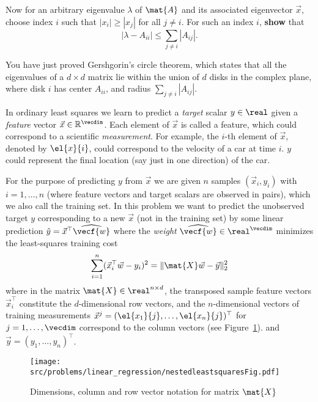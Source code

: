 \documentclass[preview]{standalone}
\begin{document}
\begin{Parts}
\Part Now for an arbitrary eigenvalue $\lambda$ of $\mat{A}$ and its
associated eigenvector $\vec{x}$, choose index $i$ such that $|x_i|
\geq |x_j|$ for all $j \neq i$. For such an index $i$, \textbf{show} that
$$|\lambda - A_{ii}| \leq \sum_{j \neq i} |A_{ij}|.$$

You have just proved Gershgorin's circle theorem, which states that
all the eigenvalues of a $d \times d$ matrix lie within the union of
$d$ disks in the complex plane, where disk $i$ has center $A_{ii}$,
and radius $\sum_{j \neq i} |A_{ij}|$.




\end{Parts}





In ordinary least squares we learn to predict a \emph{target} scalar
$y \in \real$ given a \emph{feature} vector
$\vec{x} \in \mathbb{R}^\vecdim$. Each element of $\vec{x}$ is called
a feature, which could correspond to a
scientific \emph{measurement}.
For example, the $i$-th element of
$\vec{x}$, denoted by $\el{x}{i}$, could correspond to the velocity of
a car at time $i$. $y$ could represent the final location (say just in
one direction) of the car.

For the purpose of predicting $y$ from $\vec{x}$ we are given $n$
samples $(\vec{x}_i, y_i)$ with $i = 1,\dots, n$ (where feature
vectors and target scalars are observed in pairs), which we also call
the training set. In this problem we want to predict the unobserved
target $y$ corresponding to a new $\vec{x}$ (not in the training set)
by some linear prediction $\hat{y} = \vec{x}^\top\widehat{\vecf{w}}$ where
the \emph{weight} $\widehat{\vecf{w}} \in \real^\vecdim$ minimizes the
least-squares training cost
\begin{equation*}
  \sum_{i=1}^n (\vec{x}_i^\top\vec{w} - y_i )^2 = \|\mat{X} \vec{w} - \vec{y} \|_2^2
\end{equation*}
where in the matrix $\mat{X} \in \real^{n\times d}$, the transposed
sample feature vectors $\vec{x}_i^\top$ constitute the $d$-dimensional row
vectors, and the $n$-dimensional vectors of training measurements
$\vec{x}^j = (\el{x_1}{j}, \dots, \el{x_n}{j})^\top$ for
$j = 1,\dots, \vecdim$ correspond to the column vectors (see
Figure~\ref{fig:Amat}).  and $\vec{y} = (y_1, \dots, y_n)^\top$.
\begin{figure}[h!]
  \centering
  \texttt{[image: src/problems/linear\_regression/nestedleastsquaresFig.pdf]}
  \caption{Dimensions, column and row vector notation for matrix $\mat{X}$}
  \label{fig:Amat}
\end{figure}
\end{document}
